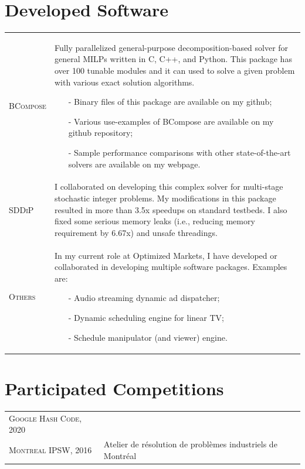 \documentclass[10PT,letter]{article}
\newcommand{\numbox}[1]{} %
\begin{document}
\section*{\numbox{9}\bfseries\textcolor{titlecol}{\sffamily Developed Software}}
			\begin{tabular}{p{1.2in}p{5.55in}}
				\textsc{BCompose} &  
												Fully parallelized general-purpose decomposition-based solver for general MILPs written in C, C++, and Python. This package has over 100 tunable modules and it can used to solve a given problem with various exact solution algorithms.
												\begin{itemize}
													\item[-] Binary files of this package are available on my github;
													\item[-] Various use-examples of BCompose are available on my github repository; 
													\item[-] Sample performance comparisons with other state-of-the-art solvers are available on my webpage. 
												\end{itemize}\\[.5mm]
				\textsc{SDDiP} & 
												I collaborated on developing  this complex solver for multi-stage stochastic integer problems. My modifications in this package resulted in more than 3.5x speedups   on  standard  testbeds.  I  also fixed some serious memory leaks (i.e., reducing memory requirement by 6.67x) and unsafe threadings. \\[.5mm]
				\textsc{Others} & 
												In my current role at Optimized Markets, I have developed or collaborated in developing multiple software packages. Examples are:
												\begin{itemize}
													\item[-] Audio streaming dynamic ad dispatcher;
													\item[-] Dynamic scheduling engine for linear TV;
													\item[-] Schedule manipulator (and viewer) engine. 
												\end{itemize}
												  \\[.5mm]
			\end{tabular}


\section*{\numbox{9}\bfseries\textcolor{titlecol}{\sffamily Participated Competitions}}
	\begin{tabular}{p{1.7in}p{5.55in}}
	\textsc{Google Hash Code, 2020} &    \\[.5mm]
	\textsc{Montreal IPSW, 2016} &  Atelier de résolution de problèmes industriels de Montréal 
	\\[.5mm]
\end{tabular}
\end{document}
